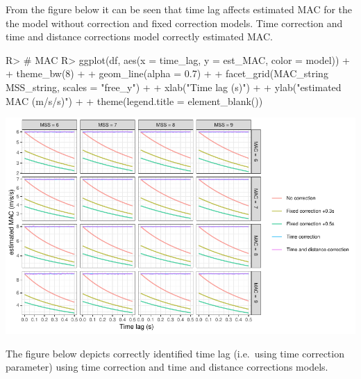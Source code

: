 \documentclass[
]{jss}
\begin{document}
From the figure below it can be seen that time lag affects estimated MAC for the the model without correction and fixed correction models. Time correction and time and distance corrections model correctly estimated MAC.

\begin{CodeChunk}
\begin{CodeInput}
R> # MAC
R> ggplot(df, aes(x = time_lag, y = est_MAC, color = model)) +
+   theme_bw(8) +
+   geom_line(alpha = 0.7) +
+   facet_grid(MAC_string ~ MSS_string, scales = "free_y") +
+   xlab("Time lag (s)") +
+   ylab("estimated MAC (m/s/s)") +
+   theme(legend.title = element_blank())
\end{CodeInput}


\begin{center}\includegraphics[width=1\linewidth]{paper_files/figure-latex/unnamed-chunk-44-1} \end{center}

\end{CodeChunk}

The figure below depicts correctly identified time lag (i.e.~using time correction parameter) using time correction and time and distance corrections models.
\end{document}
